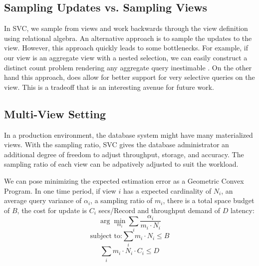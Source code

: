 \subsection{Sampling Updates vs. Sampling Views}
In SVC, we sample from views and work backwards through the view definition using relational algebra.
An alternative approach is to sample the updates to the view.
However, this approach quickly leads to some bottlenecks.
For example, if our view is an aggregate view with a nested selection, we can easily construct a distinct count problem rendering any aggregate query inestimable \cite{DBLP:conf/pods/CharikarCMN00}.
On the other hand this approach, does allow for better support for very selective queries on the view.
This is a tradeoff that is an interesting avenue for future work.

\subsection{Multi-View Setting}
In a production environment, the database system might have many materialized views. 
With the sampling ratio, SVC gives the database administrator an additional degree of freedom to adjust throughput, storage, and accuracy.
The sampling ratio of each view can be adpatively adjusted to suit the workload.

We can pose minimizing the expected estimation error as a Geometric Convex Program.
In one time period, if view $i$ has a expected cardinality of $N_i$, an average query variance of $\alpha_i$, a sampling ratio of $m_i$, there is a total space budget of $B$, the cost for update is $C_i$ secs/Record and throughput demand of $D$ latency:
\[\arg \min_{m_i} \sum_i \frac{\alpha_i}{m_i \cdot N_i}\]
\[\text{subject to:} \sum_i m_i \cdot N_i \le B \]
\[\sum_i m_i\cdot N_i \cdot C_i \le D \]




